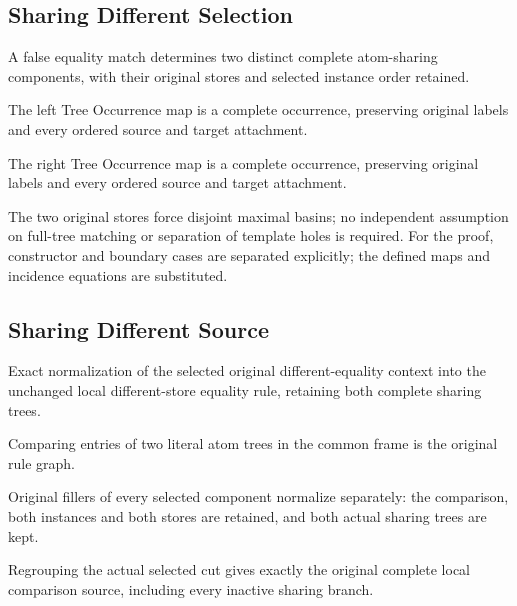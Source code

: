 \subsection{Sharing Different Selection}
A false equality match determines two distinct complete atom-sharing components, with their original stores and selected instance order retained.

The left Tree Occurrence map is a complete occurrence, preserving original labels and every ordered source and target attachment.
\par{}

The right Tree Occurrence map is a complete occurrence, preserving original labels and every ordered source and target attachment.
\par{}

The two original stores force disjoint maximal basins; no independent assumption on full-tree matching or separation of template holes is required.
For the proof, constructor and boundary cases are separated explicitly; the defined maps and incidence equations are substituted.
\par{}

\subsection{Sharing Different Source}
Exact normalization of the selected original different-equality context into the unchanged local different-store equality rule, retaining both complete sharing trees.

Comparing entries of two literal atom trees in the common frame is the original rule graph.
\par{}

Original fillers of every selected component normalize separately: the comparison, both instances and both stores are retained, and both actual sharing trees are kept.
\par{}

Regrouping the actual selected cut gives exactly the original complete local comparison source, including every inactive sharing branch.
\par{}

